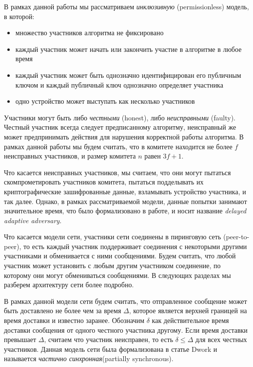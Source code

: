 В рамках данной работы мы рассматриваем \textit{инклюзивную} (permissionless) модель, в которой:
\begin{itemize}
\item множество участников алгоритма не фиксировано
\item каждый участник может начать или закончить участие в алгоритме в любое время
\item каждый участник может быть однозначно идентифицирован его публичным ключом и каждый публичный ключ однозначно определяет участника
\item одно устройство может выступать как несколько участников
\end{itemize}

Участники могут быть либо \textit{честными} (honest), либо \textit{неисправными} (faulty).  Честный участник всегда следует предписанному алгоритму, неисправный же может предпринимать действия для нарушения корректной работы алгоритма.
В рамках данной работы мы будем считать, что в комитете находится не более $f$ неисправных участников, и размер комитета $n$ равен $3f+1$.

Что касается неисправных участников, мы считаем, что они могут пытаться скомпрометировать участников комитета, пытаться подделывать их криптографические зашифрованные данные, взламывать устройство участника, и так далее. Однако, в рамках рассматриваемой модели, данные попытки занимают значительное время, что было формализовано в работе\cite{hybrid-consensus}, и носит название \textit{delayed adaptive adversary}.

Что касается модели сети, участники сети соединены в пиринговую сеть (peer-to-peer), 
то есть каждый участник поддерживает соединения с некоторыми другими участниками и обменивается с ними сообщениями. Будем считать, что любой участник может установить с любым другим участником соединение, по которому они могут обмениваться сообщениями. В следующих разделах мы разберем архитектуру сети более подробно.

В рамках данной модели сети будем считать, что отправленное сообщение может быть доставлено не более чем за время $\Delta$, которое является верхней границей на время доставки и известно заранее.
Обозначим $\delta$ как действительное время доставки сообщения от одного честного участника другому. 
Если время доставки превышает $\Delta$, считаем что участник неисправен, 
то есть $\delta \le \Delta$ для всех честных участников. 
Данная модель сети была формализована в статье Dwork \cite{Dwork:1988:CPP:42282.42283} и называется \textit{частично синхронная}(partially synchronous).


